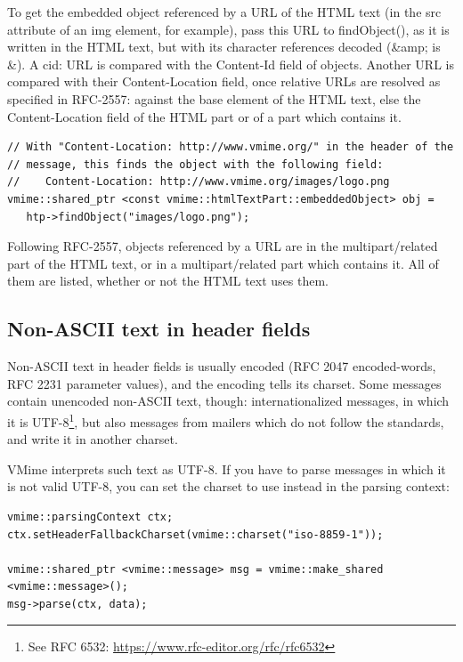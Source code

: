 To get the embedded object referenced by a URL of the HTML text (in the
{\vcode src} attribute of an {\vcode img} element, for example), pass this URL
to {\vcode findObject()}, as it is written in the HTML text, but with its
character references decoded ({\vcode \&amp;} is {\vcode \&}). A
{\vcode cid:} URL is compared with the {\vcode Content-Id} field of objects.
Another URL is compared with their {\vcode Content-Location} field, once
relative URLs are resolved as specified in RFC-2557: against the
{\vcode base} element of the HTML text, else the {\vcode Content-Location}
field of the HTML part or of a part which contains it.

\begin{lstlisting}
// With "Content-Location: http://www.vmime.org/" in the header of the
// message, this finds the object with the following field:
//    Content-Location: http://www.vmime.org/images/logo.png
vmime::shared_ptr <const vmime::htmlTextPart::embeddedObject> obj =
   htp->findObject("images/logo.png");
\end{lstlisting}

Following RFC-2557, objects referenced by a URL are in the
{\vcode multipart/related} part of the HTML text, or in a
{\vcode multipart/related} part which contains it. All of them are listed,
whether or not the HTML text uses them.


\subsection{Non-ASCII text in header fields} %

Non-ASCII text in header fields is usually encoded (RFC 2047 encoded-words,
RFC 2231 parameter values), and the encoding tells its charset. Some messages
contain unencoded non-ASCII text, though: internationalized messages, in which
it is UTF-8\footnote{See RFC 6532: \url{https://www.rfc-editor.org/rfc/rfc6532}},
but also messages from mailers which do not follow the standards, and write it
in another charset.

VMime interprets such text as UTF-8. If you have to parse messages in which it
is not valid UTF-8, you can set the charset to use instead in the parsing
context:

\begin{lstlisting}
vmime::parsingContext ctx;
ctx.setHeaderFallbackCharset(vmime::charset("iso-8859-1"));

vmime::shared_ptr <vmime::message> msg = vmime::make_shared <vmime::message>();
msg->parse(ctx, data);
\end{lstlisting}

